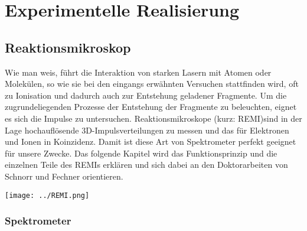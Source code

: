\chapter{Experimentelle Realisierung} 
%
%
%
%
\section{Reaktionsmikroskop}

Wie man weis, führt die Interaktion von starken Lasern mit Atomen oder Molekülen, so wie sie bei den eingangs erwähnten Versuchen stattfinden wird, oft zu Ionisation und dadurch auch zur Entstehung geladener Fragmente. Um die zugrundeliegenden Prozesse der Entstehung der Fragmente zu beleuchten, eignet es sich die Impulse zu untersuchen. Reaktionsmikroskope (kurz: REMI)sind in der Lage hochauflösende 3D-Impulsverteilungen zu messen und das für Elektronen und Ionen in Koinzidenz. Damit ist diese Art von Spektrometer perfekt geeignet für unsere Zwecke. Das folgende Kapitel wird das Funktionsprinzip und die einzelnen Teile des REMIs erklären und sich dabei an den Doktorarbeiten von Schnorr \cite{Schn14} und Fechner \cite{Fech14} orientieren. %
\begin{center}
\begin{minipage}{\linewidth}
\centering
\texttt{[image: ../REMI.png]}%
 \label{fig:REMI}
\end{minipage} 
\end{center} 

\subsection{Spektrometer}


